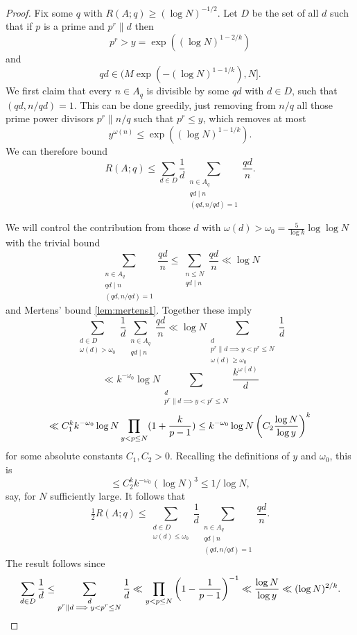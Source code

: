 \begin{proof}
Fix some $q$ with $R(A;q)\geq (\log N)^{-1/2}$. Let $D$ be the set of all $d$ such that if $p$ is a prime and $p^r \| d$ then
\[p^r>y=\exp((\log N)^{1-2/k})\]
and
\[qd\in (M\exp(-(\log N)^{1-1/k}),N].\]
We first claim that every $n\in A_q$ is divisible by some $qd$ with $d\in D$, such that $(qd,n/qd)=1$. This can be done greedily, just removing from $n/q$ all those prime power divisors $p^r\| n/q$ such that $p^r\leq y$, which removes at most
\[y^{\omega(n)}\leq  \exp((\log N)^{1-1/k}).\]
We can therefore bound
\[R(A;q) \leq \sum_{d\in D}\frac{1}{d}\sum_{\substack{n\in A_q\\ qd\mid n\\ (qd,n/qd)=1}}\frac{qd}{n}.\]

We will control the contribution from those $d$ with $\omega(d)>\omega_0= \frac{5}{\log k}\log\log N$ with the trivial bound
\[\sum_{\substack{n\in A_q\\ qd\mid n\\ (qd,n/qd)=1}}\frac{qd}{n} \leq \sum_{\substack{n\leq N\\ qd\mid n}}\frac{qd}{n}\ll \log N\]
and Mertens' bound \ref{lem:mertens1}. Together these imply
\[
\sum_{\substack{d\in D\\ \omega(d)>\omega_0}}\frac{1}{d}\sum_{\substack{n\in A_q\\ qd\mid n}}\frac{qd}{n}
\ll \log N\sum_{\substack{d\\ p^r\| d\implies y<p^r\leq N\\ \omega(d)\geq \omega_0}} \frac{1}{d}\]
\[\ll
k^{-\omega_0}\log N\sum_{\substack{d\\ p^r\| d\implies y<p^r\leq N}} \frac{k^{\omega(d)}}{d}\]
\[\ll C_1^kk^{-\omega_0}\log N\prod_{y<p\leq N}(1+\frac{k}{p-1})
 \leq k^{-\omega_0}\log N\left( C_2\frac{\log N}{\log y}\right)^{k}\]
for some absolute constants $C_1,C_2>0$. Recalling the definitions of $y$ and $\omega_0$, this is
\[\leq C_2^kk^{-\omega_0}(\log N)^3\leq 1/\log N,\]
say, for $N$ sufficiently large. It follows that
\[\tfrac{1}{2}R(A;q)\leq \sum_{\substack{d\in D\\ \omega(d)\leq \omega_0}}\frac{1}{d}\sum_{\substack{n\in A_q\\ qd\mid n\\ (qd,n/qd)=1}}\frac{qd}{n} .\]
The result follows since
\[\sum_{d\in D}\frac{1}{d}\leq \sum_{\substack{d\\ p^r\| d\implies y<p^r\leq N}}\frac{1}{d} \ll \prod_{y<p\leq N}\left( 1-\frac{1}{p-1}\right)^{-1}\ll \frac{\log N}{\log y}\ll (\log N)^{2/k}.\]
\end{proof}

